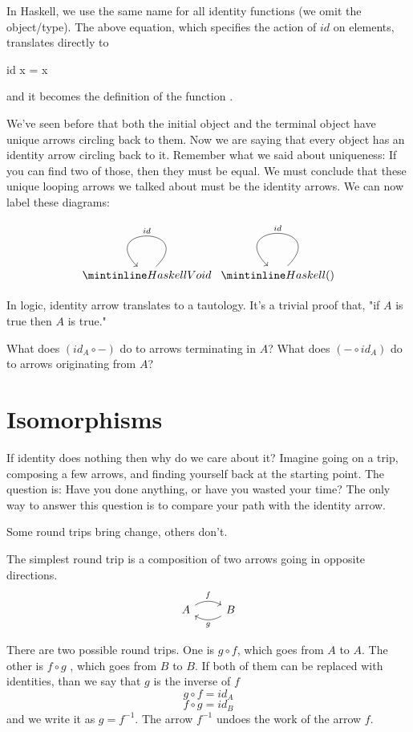 \documentclass[DaoFP]{subfiles}
\begin{document}
In Haskell, we use the same name  for all identity functions (we omit the object/type). The above equation, which specifies the action of $id$ on elements, translates directly to
\begin{haskell}
id x = x
\end{haskell}
and it becomes the definition of the function . 

We've seen before that both the initial object and the terminal object have unique arrows circling back to them. Now we are saying that every object has an identity arrow circling back to it. Remember what we said about uniqueness: If you can find two of those, then they must be equal. We must conclude that these unique looping arrows we talked about must be the identity arrows. We can now label these diagrams:

\[
 \begin{tikzcd}
 \hask{Void}
 \arrow[loop, "id"']
 \end{tikzcd}
 \begin{tikzcd}
 \hask{()}
 \arrow[loop, "id"']
 \end{tikzcd}
\]

In logic, identity arrow translates to a tautology. It's a trivial proof that, "if $A$ is true then $A$ is true."
\begin{exercise}\label{ex-yoneda-identity}
What does $(id_A \circ -)$ do to arrows terminating in $A$? What does $(- \circ id_A)$ do to arrows originating from $A$?
\end{exercise}


\section{Isomorphisms}

If identity does nothing then why do we care about it? Imagine going on a trip, composing a few arrows, and finding yourself back at the starting point. The question is: Have you done anything, or have you wasted your time? The only way to answer this question is to compare your path with the identity arrow. 

Some round trips bring change, others don't.

The simplest round trip is a composition of two arrows going in opposite directions. 
\[
 \begin{tikzcd}
 A
 \arrow[r, bend left, "f"]
 & B
 \arrow[l, bend left, "g"]
 \end{tikzcd}
\]

There are two possible round trips. One is $g \circ f$, which goes from $A$ to $A$. The other is $f \circ g$ , which goes from $B$ to $B$. If both of them can be replaced with identities, than we say that $g$ is the inverse of $f$
\[ g \circ f = id_A\]
\[f \circ g = id_B\]
and we write it as $g = f^{-1}$. The arrow $ f^{-1}$ undoes the work of the arrow $f$. 
\end{document}
